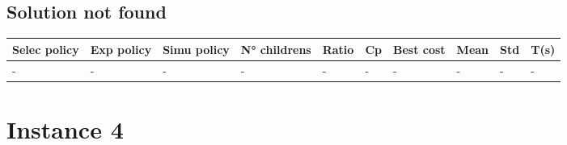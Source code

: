 \begin{center}
\begin{longtable}
    \bottomrule
  \end{longtable}
\end{center}

\subsection{Solution not found}
\begin{center}
  \small
  \begin{longtable}{||>{\centering\arraybackslash}p{1.3cm}
    >{\centering\arraybackslash}p{1.3cm}
    >{\centering\arraybackslash}p{1.3cm}
    >{\centering\arraybackslash}p{1.3cm}
    >{\centering\arraybackslash}p{0.7cm}
    >{\centering\arraybackslash}p{0.8cm}
    >{\centering\arraybackslash}p{1cm}
    >{\centering\arraybackslash}p{1cm}
    >{\centering\arraybackslash}p{1cm}
    >{\centering\arraybackslash}p{1cm}
    ||}
    \toprule
    Selec policy & Exp policy & Simu policy & N° childrens & Ratio & Cp & Best cost & Mean & Std & T(s) \\
    \midrule
    -            & -          & -           & -            & -     & -  & -         & -    & -   & -    \\
    \bottomrule
  \end{longtable}
\end{center}


\section*{Instance 4}
